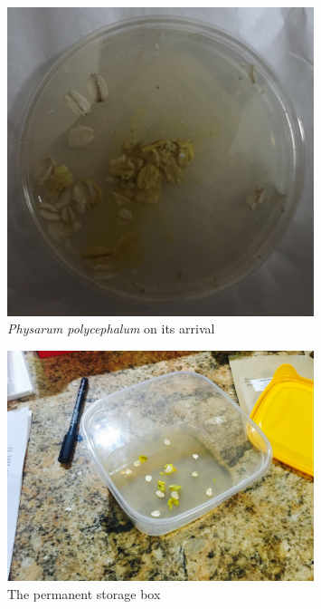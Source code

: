 \documentclass[english,a4paper,twoside]{ppfcmthesis}
\begin{document}
\begin{figure}
  \centering

  \includegraphics[width=0.8\textwidth]{figures/physarum/IMG_1168_crop.jpg}

  \caption{\textit{Physarum polycephalum} on its arrival}
  \label{figure:p_initial_petri}
\end{figure}

\begin{figure}
  \centering

  \includegraphics[width=0.8\textwidth]{figures/physarum/IMG_1179.jpg}

  \caption{The permanent storage box}
  \label{figure:p_box}
\end{figure}
\end{document}
